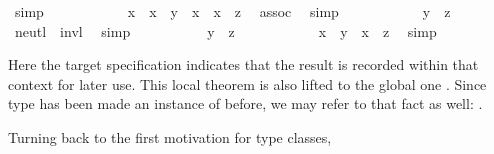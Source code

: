 \begin{isabellebody}
\ simp\isanewline
\ \ \ \ \ \ \ \ \isamarkupfalse%
\ \isamarkupfalse%
\ {\isachardoublequoteopen}{\isacharparenleft}x\isactrlloc {\isasymdiv}\ \isactrlloc {\isasymotimes}\ x{\isacharparenright}\ \isactrlloc {\isasymotimes}\ y\ {\isacharequal}\ {\isacharparenleft}x\isactrlloc {\isasymdiv}\ \isactrlloc {\isasymotimes}\ x{\isacharparenright}\ \isactrlloc {\isasymotimes}\ z{\isachardoublequoteclose}\ \isamarkupfalse%
\ assoc\ \isamarkupfalse%
\ simp\isanewline
\ \ \ \ \ \ \ \ \isamarkupfalse%
\ \isamarkupfalse%
\ {\isachardoublequoteopen}y\ {\isacharequal}\ z{\isachardoublequoteclose}\ \isamarkupfalse%
\ neutl\ \ invl\ \isamarkupfalse%
\ simp\isanewline
\ \ \ \ \isamarkupfalse%
\isanewline
\ \ \ \ \isamarkupfalse%
\ {\isachardoublequoteopen}y\ {\isacharequal}\ z{\isachardoublequoteclose}\isanewline
\ \ \ \ \ \ \ \ \isamarkupfalse%
\ \isamarkupfalse%
\ {\isachardoublequoteopen}x\ \isactrlloc {\isasymotimes}\ y\ {\isacharequal}\ x\ \isactrlloc {\isasymotimes}\ z{\isachardoublequoteclose}\ \isamarkupfalse%
\ simp\isanewline
\ \ \ \ \isamarkupfalse%
%
\endisatagproof
{\isafoldproof}%
%
\isadelimproof
%
\endisadelimproof
%
\begin{isamarkuptext}%
\noindent Here the  target specification
  indicates that the result is recorded within that context for later
  use.  This local theorem is also lifted to the global one  .  Since type  has been made an instance of
   before, we may refer to that fact as well: .%
\end{isamarkuptext}%
\isamarkuptrue%
%
\isamarkuptrue%
%
\isamarkuptrue%
%
\begin{isamarkuptext}%
Turning back to the first motivation for type classes,

\end{isamarkuptext}
\end{isabellebody}
